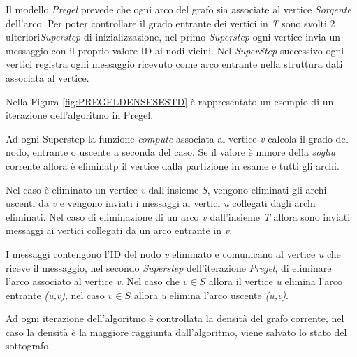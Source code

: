 \documentclass[LaM,binding=0.6cm]{sapthesis}
\begin{document}
Il modello \textit{Pregel} prevede che ogni arco del grafo sia associate al vertice \textit{Sorgente} dell'arco. Per poter controllare il grado entrante dei vertici in \textit{T} sono svolti 2 ulteriori\textit{Superstep} di inizializzazione, nel primo \textit{Superstep} ogni vertice invia un messaggio con il proprio valore ID ai nodi vicini. Nel \textit{SuperStep} successivo ogni vertici registra ogni messaggio ricevuto come arco entrante nella struttura dati associata al vertice.

Nella Figura \ref{fig:PREGELDENSESESTD} è rappresentato un esempio di un iterazione dell'algoritmo in Pregel.


Ad ogni Superstep la funzione \textit{compute} associata al vertice \textit{v} calcola il grado del nodo, entrante o uscente a seconda del caso. Se il valore è minore della \textit{soglia} corrente allora è eliminatp il vertice dalla partizione in esame e tutti gli archi.

Nel caso è eliminato un vertice \textit{v} dall'insieme \textit{S}, vengono eliminati gli archi uscenti da \textit{v} e vengono inviati i messaggi ai vertici \textit{u} collegati dagli archi eliminati. Nel caso di eliminazione di un arco \textit{v} dall'insieme  \textit{T} allora sono inviati messaggi ai vertici collegati da un arco entrante in \textit{v}. 

I messaggi contengono l'ID del nodo \textit{v} eliminato e comunicano al vertice \textit{u} che riceve il messaggio, nel secondo \textit{Superstep} dell'iterazione \textit{Pregel}, di eliminare l'arco associato al vertice \textit{v}. Nel caso che \textit{$v\in S$} allora il vertice \textit{u} elimina l'arco entrante \textit{(u,v)}, nel caso {$v \in S$} allora \textit{u} elimina l'arco uscente \textit{(u,v)}.

Ad ogni iterazione dell'algoritmo è controllata la densità del grafo corrente, nel caso la densità è la maggiore raggiunta dall'algoritmo, viene salvato lo stato del sottografo.
\end{document}
